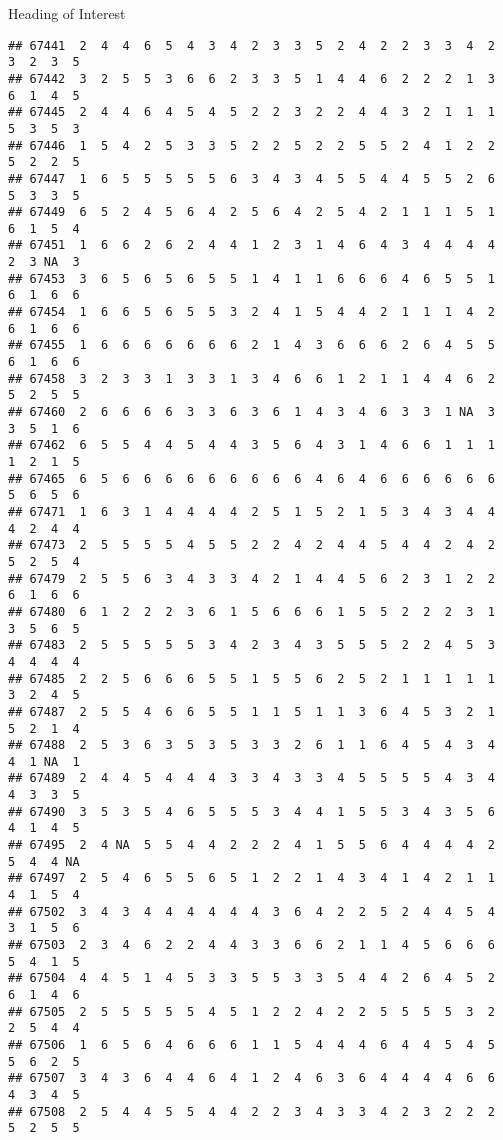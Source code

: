 \documentclass[
  ignorenonframetext,
]{beamer}
\begin{document}
\begin{frame}[fragile]{Heading of Interest}
\begin{verbatim}
## 67441  2  4  4  6  5  4  3  4  2  3  3  5  2  4  2  2  3  3  4  2  3  2  3  5
## 67442  3  2  5  5  3  6  6  2  3  3  5  1  4  4  6  2  2  2  1  3  6  1  4  5
## 67445  2  4  4  6  4  5  4  5  2  2  3  2  2  4  4  3  2  1  1  1  5  3  5  3
## 67446  1  5  4  2  5  3  3  5  2  2  5  2  2  5  5  2  4  1  2  2  5  2  2  5
## 67447  1  6  5  5  5  5  5  6  3  4  3  4  5  5  4  4  5  5  2  6  5  3  3  5
## 67449  6  5  2  4  5  6  4  2  5  6  4  2  5  4  2  1  1  1  5  1  6  1  5  4
## 67451  1  6  6  2  6  2  4  4  1  2  3  1  4  6  4  3  4  4  4  4  2  3 NA  3
## 67453  3  6  5  6  5  6  5  5  1  4  1  1  6  6  6  4  6  5  5  1  6  1  6  6
## 67454  1  6  6  5  6  5  5  3  2  4  1  5  4  4  2  1  1  1  4  2  6  1  6  6
## 67455  1  6  6  6  6  6  6  6  2  1  4  3  6  6  6  2  6  4  5  5  6  1  6  6
## 67458  3  2  3  3  1  3  3  1  3  4  6  6  1  2  1  1  4  4  6  2  5  2  5  5
## 67460  2  6  6  6  6  3  3  6  3  6  1  4  3  4  6  3  3  1 NA  3  3  5  1  6
## 67462  6  5  5  4  4  5  4  4  3  5  6  4  3  1  4  6  6  1  1  1  1  2  1  5
## 67465  6  5  6  6  6  6  6  6  6  6  6  4  6  4  6  6  6  6  6  6  5  6  5  6
## 67471  1  6  3  1  4  4  4  4  2  5  1  5  2  1  5  3  4  3  4  4  4  2  4  4
## 67473  2  5  5  5  5  4  5  5  2  2  4  2  4  4  5  4  4  2  4  2  5  2  5  4
## 67479  2  5  5  6  3  4  3  3  4  2  1  4  4  5  6  2  3  1  2  2  6  1  6  6
## 67480  6  1  2  2  2  3  6  1  5  6  6  6  1  5  5  2  2  2  3  1  3  5  6  5
## 67483  2  5  5  5  5  5  3  4  2  3  4  3  5  5  5  2  2  4  5  3  4  4  4  4
## 67485  2  2  5  6  6  6  5  5  1  5  5  6  2  5  2  1  1  1  1  1  3  2  4  5
## 67487  2  5  5  4  6  6  5  5  1  1  5  1  1  3  6  4  5  3  2  1  5  2  1  4
## 67488  2  5  3  6  3  5  3  5  3  3  2  6  1  1  6  4  5  4  3  4  4  1 NA  1
## 67489  2  4  4  5  4  4  4  3  3  4  3  3  4  5  5  5  5  4  3  4  4  3  3  5
## 67490  3  5  3  5  4  6  5  5  5  3  4  4  1  5  5  3  4  3  5  6  4  1  4  5
## 67495  2  4 NA  5  5  4  4  2  2  2  4  1  5  5  6  4  4  4  4  2  5  4  4 NA
## 67497  2  5  4  6  5  5  6  5  1  2  2  1  4  3  4  1  4  2  1  1  4  1  5  4
## 67502  3  4  3  4  4  4  4  4  4  3  6  4  2  2  5  2  4  4  5  4  3  1  5  6
## 67503  2  3  4  6  2  2  4  4  3  3  6  6  2  1  1  4  5  6  6  6  5  4  1  5
## 67504  4  4  5  1  4  5  3  3  5  5  3  3  5  4  4  2  6  4  5  2  6  1  4  6
## 67505  2  5  5  5  5  5  4  5  1  2  2  4  2  2  5  5  5  5  3  2  2  5  4  4
## 67506  1  6  5  6  4  6  6  6  1  1  5  4  4  4  6  4  4  5  4  5  5  6  2  5
## 67507  3  4  3  6  4  4  6  4  1  2  4  6  3  6  4  4  4  4  6  6  4  3  4  5
## 67508  2  5  4  4  5  5  4  4  2  2  3  4  3  3  4  2  3  2  2  2  5  2  5  5

\end{verbatim}
\end{frame}
\end{document}
